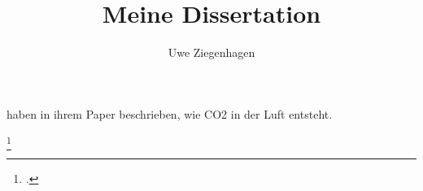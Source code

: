 \documentclass[ngerman,12pt,parskip=half]{scrartcl}
\author{Uwe Ziegenhagen}
\title{Meine Dissertation}
\begin{document}
\maketitle

\tableofcontents

\blindtext

\cite{knuth:1984}

\cite{amt-14-2717-2021}

\cite{ziegenhagen:2017}

\citeauthor{amt-14-2717-2021} haben in ihrem Paper  \citeyear{amt-14-2717-2021} beschrieben, wie CO2 in der Luft entsteht. 

\parencite{knuth:1984}

\blindtext[4]

\cite{ziegenhagen:2017}

\parencite{knuth:1984}


\footcite{knuth:1984}

\cite{amt-14-2717-2021}

\printbibliography[type=article, title={Genutzte Artikel}]

\printbibliography[type=book, title={Genutzte Bücher}]
\end{document}
